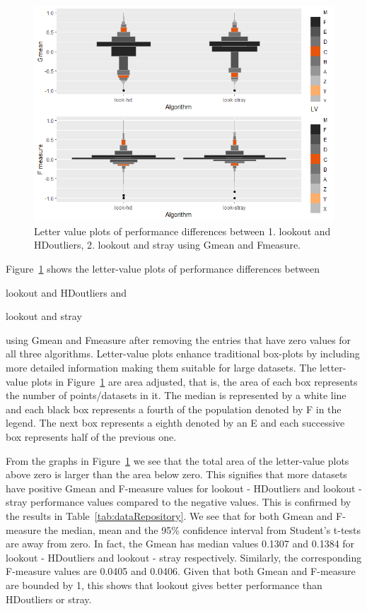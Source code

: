 \documentclass[letter,12pt]{article}
\begin{document}
\begin{figure}[!ht]
    \centering
    \includegraphics[scale=0.7]{lvplots.png}
    \caption{Letter value plots of performance differences between 1. lookout and HDoutliers, 2. lookout and stray using Gmean and Fmeasure.}
    \label{fig:lvplots}
\end{figure}

Figure~\ref{fig:lvplots}  shows the letter-value plots \citep{lvplots}  of performance differences between \begin{inparaenum} \item lookout and HDoutliers and \item lookout and stray \end{inparaenum}  using Gmean and Fmeasure after removing the entries that have zero values for all three algorithms. Letter-value plots enhance traditional box-plots by including more detailed information making them suitable for large datasets. The  letter-value plots in Figure~\ref{fig:lvplots} are area adjusted, that is, the area of each box represents the number of points/datasets in it. The median is represented by a white line and each black box represents a fourth of the population denoted by F in the legend. The next box represents a eighth denoted by an E and each successive box represents half of the previous one. 

From the graphs in Figure~\ref{fig:lvplots}  we see that the total area of the letter-value plots above zero is larger than the area below zero. This signifies that more datasets have positive Gmean and F-measure values for lookout - HDoutliers and lookout - stray performance values compared to the negative values.  This is confirmed by the results in Table~\ref{tab:dataRepository}. We see that for both Gmean and  F-measure the median, mean and the 95\% confidence interval from Student's t-tests are away from zero. In fact, the Gmean has median values  0.1307 and 0.1384 for lookout - HDoutliers and lookout - stray respectively. Similarly, the corresponding  F-measure values are 0.0405 and 0.0406. Given that both Gmean and F-measure are bounded by 1, this shows that lookout gives better performance than HDoutliers or stray. 
\end{document}
